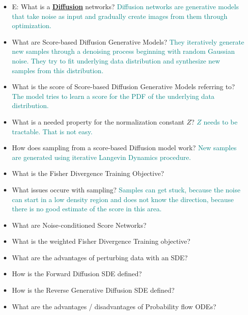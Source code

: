 \documentclass{report}
\newcommand{\asw}[2][teal]{}
\renewcommand{\asw}[2][teal]{\textcolor{#1}{#2}}
\begin{document}
\begin{itemize}
		\item E: What is a \textbf{\underline{Diffusion}} networks?
		\asw{\newline Diffusion networks are generative models that take noise as input and gradually create images from them through optimization.}
		\item What are Score-based Diffusion Generative Models?
		\asw{\newline They iteratively generate new samples through a denoising process beginning with random Gaussian noise. They try to fit underlying data distribution and synthesize new samples from this distribution.}
		\item What is the score of Score-based Diffusion Generative Models referring to?
		\asw{\newline The model tries to learn a score for the PDF of the underlying data distribution.}
		\item What is a needed property for the normalization constant $Z$?
		\asw{\newline $Z$ needs to be tractable. That is not easy.}
		\item How does sampling from a score-based Diffusion model work?
		\asw{\newline New samples are generated using iterative Langevin Dynamics procedure.}
		\item What is the Fisher Divergence Training Objective?
		\asw{\newline }
		\item What issues occure with sampling?
		\asw{\newline Samples can get stuck, because the noise can start in a low density region and does not know the direction, because there is no good estimate of the score in this area.}
		\item What are Noise-conditioned Score Networks?
		\asw{\newline }
		\item What is the weighted Fisher Divergence Training objective?
		\asw{\newline }
		\item What are the advantages of perturbing data with an SDE?
		\asw{\newline }
		\item How is the Forward Diffusion SDE defined?
		\asw{\newline }
		\item How is the Reverse Generative Diffusion SDE defined?
		\asw{\newline }
		\item What are the advantages / disadvantages of Probability flow ODEs?

\end{itemize}
\end{document}
